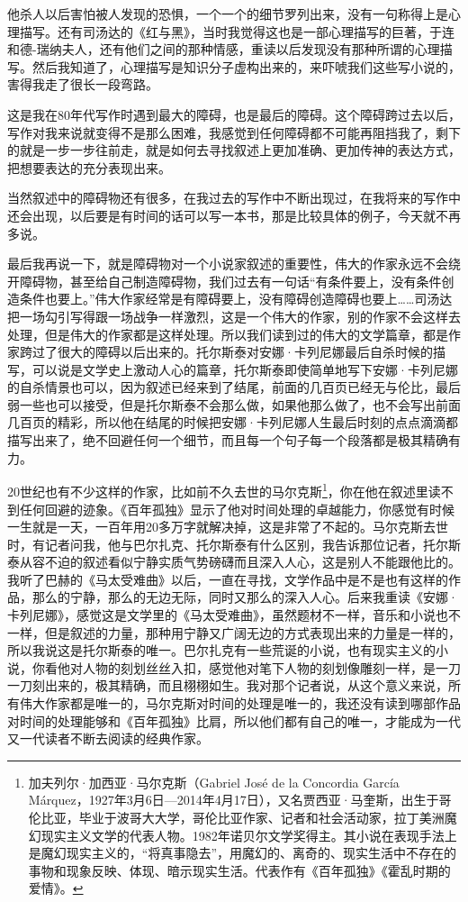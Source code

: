 \documentclass[12pt,a5paper]{ctexbook}
\begin{document}
他杀人以后害怕被人发现的恐惧，一个一个的细节罗列出来，没有一句称得上是心理描写。还有司汤达的《红与黑》，当时我觉得这也是一部心理描写的巨著，于连和德-瑞纳夫人，还有他们之间的那种情感，重读以后发现没有那种所谓的心理描写。然后我知道了，心理描写是知识分子虚构出来的，来吓唬我们这些写小说的，害得我走了很长一段弯路。

这是我在80年代写作时遇到最大的障碍，也是最后的障碍。这个障碍跨过去以后，写作对我来说就变得不是那么困难，我感觉到任何障碍都不可能再阻挡我了，剩下的就是一步一步往前走，就是如何去寻找叙述上更加准确、更加传神的表达方式，把想要表达的充分表现出来。

当然叙述中的障碍物还有很多，在我过去的写作中不断出现过，在我将来的写作中还会出现，以后要是有时间的话可以写一本书，那是比较具体的例子，今天就不再多说。

最后我再说一下，就是障碍物对一个小说家叙述的重要性，伟大的作家永远不会绕开障碍物，甚至给自己制造障碍物，我们过去有一句话“有条件要上，没有条件创造条件也要上。”伟大作家经常是有障碍要上，没有障碍创造障碍也要上……司汤达把一场勾引写得跟一场战争一样激烈，这是一个伟大的作家，别的作家不会这样去处理，但是伟大的作家都是这样处理。所以我们读到过的伟大的文学篇章，都是作家跨过了很大的障碍以后出来的。托尔斯泰对安娜·卡列尼娜最后自杀时候的描写，可以说是文学史上激动人心的篇章，托尔斯泰即使简单地写下安娜·卡列尼娜的自杀情景也可以，因为叙述已经来到了结尾，前面的几百页已经无与伦比，最后弱一些也可以接受，但是托尔斯泰不会那么做，如果他那么做了，也不会写出前面几百页的精彩，所以他在结尾的时候把安娜·卡列尼娜人生最后时刻的点点滴滴都描写出来了，绝不回避任何一个细节，而且每一个句子每一个段落都是极其精确有力。

20世纪也有不少这样的作家，比如前不久去世的马尔克斯\footnote{加夫列尔·加西亚·马尔克斯（Gabriel José de la Concordia García Márquez，1927年3月6日—2014年4月17日），又名贾西亚·马奎斯，出生于哥伦比亚，毕业于波哥大大学，哥伦比亚作家、记者和社会活动家，拉丁美洲魔幻现实主义文学的代表人物。1982年诺贝尔文学奖得主。其小说在表现手法上是魔幻现实主义的，“将真事隐去”，用魔幻的、离奇的、现实生活中不存在的事物和现象反映、体现、暗示现实生活。代表作有《百年孤独》《霍乱时期的爱情》。}，你在他在叙述里读不到任何回避的迹象。《百年孤独》显示了他对时间处理的卓越能力，你感觉有时候一生就是一天，一百年用20多万字就解决掉，这是非常了不起的。马尔克斯去世时，有记者问我，他与巴尔扎克、托尔斯泰有什么区别，我告诉那位记者，托尔斯泰从容不迫的叙述看似宁静实质气势磅礴而且深入人心，这是别人不能跟他比的。我听了巴赫的《马太受难曲》以后，一直在寻找，文学作品中是不是也有这样的作品，那么的宁静，那么的无边无际，同时又那么的深入人心。后来我重读《安娜·卡列尼娜》，感觉这是文学里的《马太受难曲》，虽然题材不一样，音乐和小说也不一样，但是叙述的力量，那种用宁静又广阔无边的方式表现出来的力量是一样的，所以我说这是托尔斯泰的唯一。巴尔扎克有一些荒诞的小说，也有现实主义的小说，你看他对人物的刻划丝丝入扣，感觉他对笔下人物的刻划像雕刻一样，是一刀一刀刻出来的，极其精确，而且栩栩如生。我对那个记者说，从这个意义来说，所有伟大作家都是唯一的，马尔克斯对时间的处理是唯一的，我还没有读到哪部作品对时间的处理能够和《百年孤独》比肩，所以他们都有自己的唯一，才能成为一代又一代读者不断去阅读的经典作家。
\end{document}
